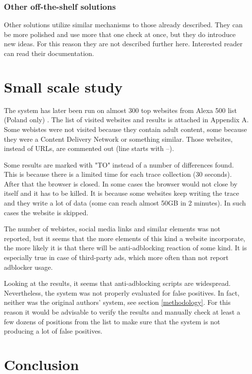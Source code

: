 \subsubsection{Other off-the-shelf solutions}
Other solutions utilize similar mechanisms to those already described.
They can be more polished and use more that one check at once, but
they do introduce new ideas. For this reason they are not described further here.
Interested reader can read their documentation.


\section{Small scale study}


The system has later been run on almost 300 top websites from Alexa 500 list (Poland only) \cite{alexa-list}.
The list of visited websites and results is attached in Appendix A. Some webistes were not visited because they
contain adult content, some because they were a Content Delivery Network or something similar. Those
websites, instead of URLs, are commented out (line starts with --).

Some results are marked with "TO" instead of a number of differences found. This is because
there is a limited time for each trace collection (30 seconds). After that the browser is closed.
In some cases the browser would not close by itself and it has to be killed. It is because 
some websites keep writing the trace and they write a lot of data (some can reach almost 50GB in 2 minutes).
In such cases the website is skipped.

The number of webistes, social media links and similar elements was not reported, but it seems that the more 
elements of this kind a website incorporate, the more likely it is that there will be anti-adblocking reaction of some kind.
It is especially true in case of third-party ads, which more often than not report adblocker usage.

Looking at the results, it seems that anti-adblocking scripts are widespread. 
Nevertheless, the system was not properly evaluated for false positives.
In fact, neither was the original authors' system, see section \ref{methodology}.
For this reason it would be advisable to verify the results and manually check at least 
a few dozens of positions from the list to make sure that the system is not producing 
a lot of false positives.


\section{Conclusion}

